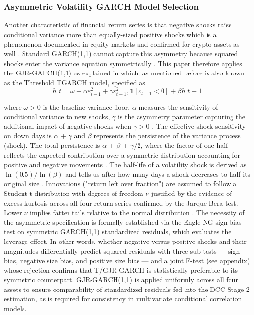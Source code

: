 \documentclass[12pt,a4paper,titlepage,oneside,english]{article}
\begin{document}
\subsubsection{Asymmetric Volatility GARCH Model Selection}
Another characteristic of financial return series is that negative shocks raise conditional variance more than equally-sized positive shocks which is a phenomenon documented in equity markets and confirmed for crypto assets as well \parencite{Bouri2017return}. Standard GARCH(1,1) cannot capture this asymmetry because squared shocks enter the variance equation symmetrically \parencite{Ruey2013}. This paper therefore applies the GJR-GARCH(1,1) as explained in \parencite{Ruey2013} which, as mentioned before is also known as the Threshold TGARCH model, specified as
\begin{equation}
h\_t = \omega + \alpha \varepsilon_{t-1}^2 + \gamma \varepsilon_{t-1}^2 , \mathbf{1}[\varepsilon_{t-1} < 0] + \beta h\_{t-1}
\end{equation}

where $\omega > 0$ is the baseline variance floor, $\alpha$ measures the sensitivity of conditional variance to new shocks, $\gamma$ is the asymmetry parameter capturing the additional impact of negative shocks when $\gamma > 0$ \parencite{Ruey2013}. The effective shock sensitivity on down days is $\alpha$ + $\gamma$ and $\beta$ represents the persistence of the variance process (shock). The total persistence is $\alpha$ + $\beta$ + $\gamma$/2, where the factor of one-half reflects the expected contribution over a symmetric distribution accounting for positive and negative movements \parencite{doi:https://doi.org/10.1002/9780470644560.ch3}. The half-life of a volatility shock is derived as $\ln(0.5)/\ln(\beta)$ and tells us after how many days a shock decreases to half its original size \parencite{Engle01022001}. Innovations ("return left over fraction") are assumed to follow a Student-t distribution with degrees of freedom $\nu$ justified by the evidence of excess kurtosis across all four return series confirmed by the Jarque-Bera test. Lower $\nu$ implies fatter tails relative to the normal distribution \parencite{bollerslev1987garch}. The necessity of the asymmetric specification is formally established via the Engle-NG \parencite{Engle01011993} sign bias test on symmetric GARCH(1,1) standardized residuals, which evaluates the leverage effect. In other words, whether negative versus positive shocks and their magnitudes differentially predict squared residuals with three sub-tests — sign bias, negative size bias, and positive size bias — and a joint F-test (see appendix) whose rejection confirms that T/GJR-GARCH is statistically preferable to its symmetric counterpart. GJR-GARCH(1,1) is applied uniformly across all four assets to ensure comparability of standardized residuals fed into the DCC Stage 2 estimation, as is required for consistency in multivariate conditional correlation models.
\end{document}
